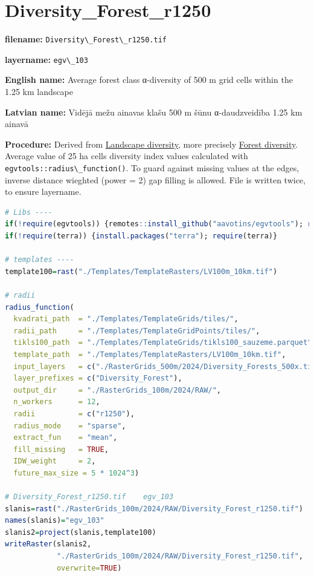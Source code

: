 \documentclass[
]{book}
\newcommand{\passthrough}[1]{#1}
\begin{document}
\section{Diversity\_Forest\_r1250}\label{ch06.103}

\textbf{filename:} \passthrough{\lstinline!Diversity\_Forest\_r1250.tif!}

\textbf{layername:} \passthrough{\lstinline!egv\_103!}

\textbf{English name:} Average forest class α-diversity of 500 m grid cells within the 1.25 km landscape

\textbf{Latvian name:} Vidējā mežu ainavas klašu 500 m šūnu α-daudzveidība 1.25 km ainavā

\textbf{Procedure:} Derived from \hyperref[Ch05.04]{Landscape diversity}, more precisely
\hyperref[Ch05.04.02]{Forest diversity}. Average value of 25 ha
cells diversity index values calculated with \passthrough{\lstinline!egvtools::radius\_function()!}. To
guard against missing values at the edges, inverse distance wieghted (power = 2)
gap filling is allowed. File is written twice, to ensure layername.

\begin{lstlisting}[language=R]
# Libs ----
if(!require(egvtools)) {remotes::install_github("aavotins/egvtools"); require(egvtools)}
if(!require(terra)) {install.packages("terra"); require(terra)}

# templates ----
template100=rast("./Templates/TemplateRasters/LV100m_10km.tif")

# radii
radius_function(
  kvadrati_path  = "./Templates/TemplateGrids/tiles/",
  radii_path     = "./Templates/TemplateGridPoints/tiles/",
  tikls100_path  = "./Templates/TemplateGrids/tikls100_sauzeme.parquet",
  template_path  = "./Templates/TemplateRasters/LV100m_10km.tif",
  input_layers   = c("./RasterGrids_500m/2024/Diversity_Forests_500x.tif"),
  layer_prefixes = c("Diversity_Forest"),
  output_dir     = "./RasterGrids_100m/2024/RAW/",
  n_workers      = 12,
  radii          = c("r1250"),
  radius_mode    = "sparse",
  extract_fun    = "mean",
  fill_missing   = TRUE,
  IDW_weight     = 2,
  future_max_size = 5 * 1024^3)

# Diversity_Forest_r1250.tif    egv_103
slanis=rast("./RasterGrids_100m/2024/RAW/Diversity_Forest_r1250.tif")
names(slanis)="egv_103"
slanis2=project(slanis,template100)
writeRaster(slanis2,
            "./RasterGrids_100m/2024/RAW/Diversity_Forest_r1250.tif",
            overwrite=TRUE)
\end{lstlisting}
\end{document}
